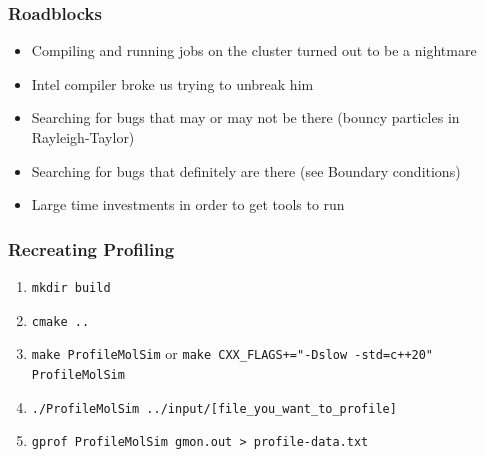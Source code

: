 \begin{frame}
	\frametitle{Roadblocks}
	\large
	\begin{itemize}
		\item Compiling and running jobs on the cluster turned out to be a nightmare
		\item Intel compiler broke us trying to unbreak him
		\item Searching for bugs that may or may not be there (bouncy particles in Rayleigh-Taylor)
		\item Searching for bugs that definitely are there (see Boundary conditions)
		\item Large time investments in order to get tools to run
	\end{itemize}
\end{frame}

\begin{frame}
	\PraesentationBildUhrenturm
\end{frame}

\begin{frame}
	\frametitle{Recreating Profiling}
	\large
	\begin{enumerate}
		\item \texttt{mkdir build}
		\item \texttt{cmake ..}
		\item \texttt{make ProfileMolSim} or \texttt{make CXX\_FLAGS+="-Dslow -std=c++20" ProfileMolSim}
		\item  \texttt{./ProfileMolSim ../input/[file\_you\_want\_to\_profile]}
		\item  \texttt{gprof ProfileMolSim gmon.out > profile-data.txt}
	\end{enumerate}
\end{frame}





